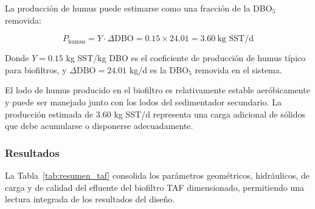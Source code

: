 \documentclass[12pt,a4paper]{article}
\begin{document}
La producción de humus puede estimarse como una fracción de la DBO$_5$ removida:

\begin{equation}
P_{\text{humus}} = Y \cdot \Delta\text{DBO} = 0.15 \times 24.01 = 3.60\ \text{kg SST/d}
\end{equation}

Donde $Y = 0.15$ kg SST/kg DBO es el coeficiente de producción de humus típico para biofiltros, y $\Delta\text{DBO} = 24.01$ kg/d es la DBO$_5$ removida en el sistema.

El lodo de humus producido en el biofiltro es relativamente estable aeróbicamente y puede ser manejado junto con los lodos del sedimentador secundario. La producción estimada de 3.60 kg SST/d representa una carga adicional de sólidos que debe acumularse o disponerse adecuadamente.

\subsubsection{Resultados}

La Tabla~\ref{tab:resumen_taf} consolida los parámetros geométricos, hidráulicos, de carga y de calidad del efluente del biofiltro TAF dimensionado, permitiendo una lectura integrada de los resultados del diseño.
\end{document}
